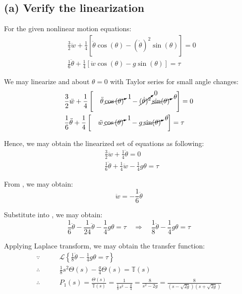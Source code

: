 \documentclass{tron}
\begin{document}
\subsection{(a) Verify the linearization \label{ans:P1-a}}
	For the given nonlinear motion equations:
	\begin{align}
		& \frac32 \ddot{w} + \frac14 \left[ \ddot{\theta} \cos{(\theta)} - (\dot{\theta})^2 \sin(\theta) \right] = 0 \label{eqn:a:1} \\
		& \frac16 \ddot{\theta} + \frac14 \left[ \ddot{w} \cos{(\theta)} - g \sin(\theta) \right] = \tau \label{eqn:a:2}
	\end{align}
	
	We may linearize  and  about $\theta = 0$ with Taylor series for small angle changes:
	\begin{align}
		& \frac32 \ddot{w} + \frac14 \left[ \quad \ddot{\theta} \, \cancelto{1}{\cos{(\theta)}} \quad  - \cancelto{0}{(\dot{\theta})^2} \, \cancelto{\theta}{\sin(\theta)} \quad \right] = 0  \\
		& \frac16 \ddot{\theta} + \frac14 \left[ \quad  \ddot{w} \, \cancelto{1}{\cos{(\theta)}} \quad  - g \, \cancelto{\theta}{\sin(\theta)} \quad \right] = \tau 
	\end{align}
	
	Hence, we may obtain the linearized set of equations as following:
	\begin{align}
		& \frac32 \ddot{w} + \frac14 \ddot{\theta} = 0 \label{eqn:a:1:linear} \\
		& \frac16 \ddot{\theta} + \frac14 \ddot{w} - \frac14 g \theta = \tau \label{eqn:a:2:linear}
	\end{align}
	
	From , we may obtain:
	\begin{equation}
		\ddot{w} = -\frac16 \ddot{\theta} \label{eqn:a:w-theta}
	\end{equation}
	
	Substitute  into , we may obtain:
	\begin{equation}
		\frac16 \ddot{\theta} - \frac1{24} \ddot{\theta} - \frac14 g \theta = \tau \quad \Rightarrow \quad \frac18 \ddot{\theta}- \frac14 g \theta = \tau
	\end{equation}
	
	Applying Laplace transform, we may obtain the transfer function:
	\begin{align}
		\because \qquad 		& \mathcal{L}\left\{ \frac18 \ddot{\theta}- \frac14 g \theta = \tau \right\} \\
		\therefore \qquad 	& \frac18 s^2 \Theta(s) - \frac{g}4 \Theta(s) = \mathbb{T}(s)  \\
		\therefore \qquad 	& P_1 (s) = \frac{\Theta(s)}{\mathbb{T}(s)} = \frac{1}{\frac18 s^2  - \frac{g}4} = \frac{8}{s^2 - 2 g} = \frac{8}{(s - \sqrt{2g})(s + \sqrt{2g})}
	\end{align}
	
\end{document}
